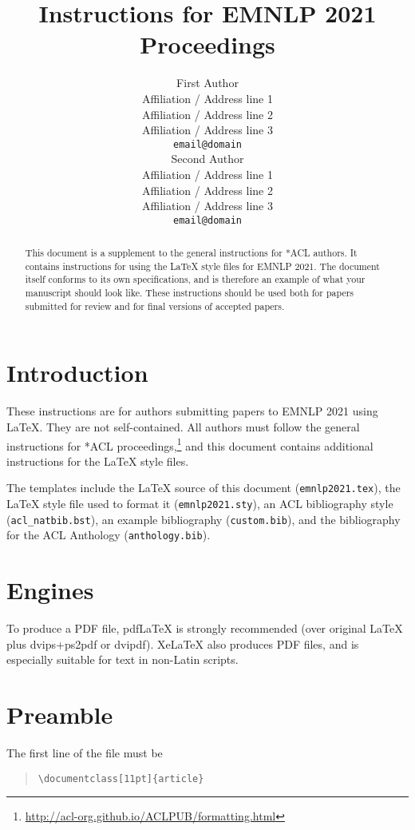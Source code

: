 \documentclass[11pt]{article}
\title{Instructions for EMNLP 2021 Proceedings}
\author{First Author \\
  Affiliation / Address line 1 \\
  Affiliation / Address line 2 \\
  Affiliation / Address line 3 \\
  \texttt{email@domain} \\\And
  Second Author \\
  Affiliation / Address line 1 \\
  Affiliation / Address line 2 \\
  Affiliation / Address line 3 \\
  \texttt{email@domain} \\}
\begin{document}
\maketitle
\begin{abstract}
This document is a supplement to the general instructions for *ACL authors. It contains instructions for using the \LaTeX{} style files for EMNLP 2021. 
The document itself conforms to its own specifications, and is therefore an example of what your manuscript should look like.
These instructions should be used both for papers submitted for review and for final versions of accepted papers.
\end{abstract}

\section{Introduction}

These instructions are for authors submitting papers to EMNLP 2021 using \LaTeX. They are not self-contained. All authors must follow the general instructions for *ACL proceedings,\footnote{\url{http://acl-org.github.io/ACLPUB/formatting.html}} and this document contains additional instructions for the \LaTeX{} style files.

The templates include the \LaTeX{} source of this document (\texttt{emnlp2021.tex}),
the \LaTeX{} style file used to format it (\texttt{emnlp2021.sty}),
an ACL bibliography style (\texttt{acl\_natbib.bst}),
an example bibliography (\texttt{custom.bib}),
and the bibliography for the ACL Anthology (\texttt{anthology.bib}).

\section{Engines}

To produce a PDF file, pdf\LaTeX{} is strongly recommended (over original \LaTeX{} plus dvips+ps2pdf or dvipdf). Xe\LaTeX{} also produces PDF files, and is especially suitable for text in non-Latin scripts.

\section{Preamble}

The first line of the file must be
\begin{quote}
\begin{verbatim}
\documentclass[11pt]{article}
\end{verbatim}
\end{quote}
\end{document}
